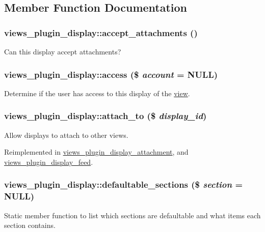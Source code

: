 \subsection{Member Function Documentation}
\hypertarget{classviews__plugin__display_af94245cf0dde1c883d9b3dc3760dbc9c}{
\subsubsection[{accept\_\-attachments}]{\setlength{\rightskip}{0pt plus 5cm}views\_\-plugin\_\-display::accept\_\-attachments ()}}
\label{classviews__plugin__display_af94245cf0dde1c883d9b3dc3760dbc9c}
Can this display accept attachments? \hypertarget{classviews__plugin__display_a122d9a961584bfb6f0c4c78715c543e5}{
\subsubsection[{access}]{\setlength{\rightskip}{0pt plus 5cm}views\_\-plugin\_\-display::access (\$ {\em account} = {\ttfamily NULL})}}
\label{classviews__plugin__display_a122d9a961584bfb6f0c4c78715c543e5}
Determine if the user has access to this display of the \hyperlink{classview}{view}. \hypertarget{classviews__plugin__display_aa74683048bca4e740cb7e25ae4c527d4}{
\subsubsection[{attach\_\-to}]{\setlength{\rightskip}{0pt plus 5cm}views\_\-plugin\_\-display::attach\_\-to (\$ {\em display\_\-id})}}
\label{classviews__plugin__display_aa74683048bca4e740cb7e25ae4c527d4}
Allow displays to attach to other views. 

Reimplemented in \hyperlink{classviews__plugin__display__attachment_ae8fcfc681cc9ff841ac5c0bdf1691b31}{views\_\-plugin\_\-display\_\-attachment}, and \hyperlink{classviews__plugin__display__feed_aea8b688de38f11854afdb4194e87f59d}{views\_\-plugin\_\-display\_\-feed}.\hypertarget{classviews__plugin__display_a1ff9cd1b5762dde8765e608efdec8ec4}{
\subsubsection[{defaultable\_\-sections}]{\setlength{\rightskip}{0pt plus 5cm}views\_\-plugin\_\-display::defaultable\_\-sections (\$ {\em section} = {\ttfamily NULL})}}
\label{classviews__plugin__display_a1ff9cd1b5762dde8765e608efdec8ec4}
Static member function to list which sections are defaultable and what items each section contains. 

